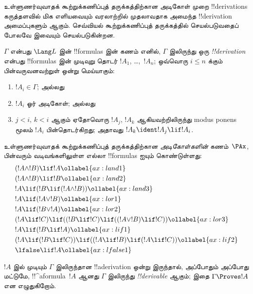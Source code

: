 \documentclass[../../../include/open-logic-section]{subfiles}
\begin{document}


உள்ளுணர்வுவாதக் கூற்றுக்கணிப்புத் தருக்கத்திற்கான அடிகோள் முறை
!!{derivation}s கருத்தளவில் மிக எளியவையும் வரலாற்றில் முதலாவதாக அமைந்த
!!{derivation} அமைப்புகளும் ஆகும். செவ்வியல் கூற்றுக்கணிப்புத் தருக்கத்தில்
செயல்படுவதைப் போலவே இவையும் செயல்படுகின்றன.

\begin{defn}[!!^{derivability}]
$\Gamma$ என்பது $\Lang L$ இன் !!{formula}s இன் கணம் எனில், $\Gamma$
இலிருந்து ஒரு \emph{!!{derivation}} என்பது !!{formula}s இன் முடிவுறு தொடர்
$!A_1$, \dots,~$!A_n$; ஒவ்வொரு $i \le n$ க்கும் பின்வருவனவற்றுள் ஒன்று
மெய்யாகும்:
\begin{enumerate}
\item $!A_i \in \Gamma$; அல்லது
\item $!A_i$ ஓர் அடிகோள்; அல்லது
\item $j < i$, $k < i$ ஆகும் ஏதோவொரு $!A_j$, $!A_k$ ஆகியவற்றிலிருந்து
  modus ponens மூலம் $!A_i$ பின்தொடர்கிறது; அதாவது $!A_k \ident !A_j
  \lif !A_i$.
\end{enumerate}
\end{defn}

\begin{defn}[அடிகோள்கள்]
உள்ளுணர்வுவாதக் கூற்றுக்கணிப்புத் தருக்கத்திற்கான \emph{அடிகோள்களின்}
கணம்~$\PAx$, பின்வரும் வடிவங்களிலுள்ள எல்லா !!{formula}s ஐயும்
கொண்டுள்ளது:
\begin{align}
  & (!A \land !B) \lif !A \ollabel{ax:land1}\\
  & (!A \land !B) \lif !B \ollabel{ax:land2}\\
  & !A \lif (!B \lif (!A \land !B)) \ollabel{ax:land3}\\
  & !A \lif (!A \lor !B) \ollabel{ax:lor1}\\
  & !A \lif (!B \lor !A) \ollabel{ax:lor2}\\
  & (!A \lif !C) \lif ((!B \lif !C) \lif ((!A \lor !B) \lif !C)) \ollabel{ax:lor3}\\
  & !A \lif (!B \lif !A) \ollabel{ax:lif1}\\
  & (!A \lif (!B \lif !C)) \lif ((!A \lif !B) \lif (!A \lif !C)) \ollabel{ax:lif2}\\
  & \lfalse \lif !A \ollabel{ax:lfalse1}
\end{align}
\end{defn}

\begin{defn}[!!^{derivability}]
$!A$ இல் முடியும் $\Gamma$ இலிருந்தான !!a{derivation} ஒன்று இருந்தால்,
அப்போதும் அப்போது மட்டுமே, !!^a{formula}~$!A$ ஆனது $\Gamma$ இலிருந்து
\emph{!!{derivable}} ஆகும்; இதை $\Gamma \Proves !A$ என எழுதுகிறோம்.
\end{defn}
\end{document}
